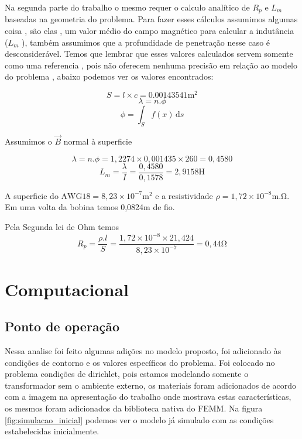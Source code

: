 \documentclass[
	12pt,				%
	openright,			%
	twoside,			%
	a4paper,			%
	english,			%
	french,				%
	spanish,			%
	brazil,				%
	]{abntex2}
\begin{document}
Na segunda parte do trabalho o mesmo requer o calculo analítico de $R_{p}$
e $L_{m}$ baseadas na geometria do problema. Para fazer esses cálculos assumimos algumas coisa , são elas , um valor médio do campo magnético para calcular a indutância ($L_{m}$
), também assumimos que a profundidade de penetração nesse caso é desconsiderável. 
Temos que lembrar que esses valores calculados servem somente como uma referencia , pois não oferecem nenhuma precisão em relação ao modelo do problema , abaixo podemos ver os valores encontrados:

$$S = l \times c = 0.00143541\mathrm{m^{2}}$$
$$\lambda = n . \phi $$
$$\phi = \int_S \! f(x) \, \mathrm{d}s$$

Assumimos o  $\vec B$ normal à superficie 

$$\lambda = n . \phi = 1,2274 \times 0,001435 \times 260 = 0,4580$$
$$L_{m} = \frac{\lambda}{I} = \frac{0,4580}{0,1578} = 2,9158  \mathrm{H}$$

A superficie do $\mathrm{AWG18} = 8,23 \times 10^{-7} \mathrm{m^2}$ e a resistividade $\rho = 1,72 \times 10^{-8} \mathrm{m.\Omega}$. Em uma volta da bobina temos 0,0824m de fio.


Pela Segunda lei de Ohm temos
$$ R_{p} = \frac{\rho . l}{S} = \frac{1,72 \times 10^{-8} \times 21,424}{8,23 \times 10^{-7}} = 0,44 \mathrm{\Omega} $$

\section{Computacional}

\subsection{Ponto de operação}
Nessa analise foi feito algumas adições no modelo proposto, foi adicionado às condições de contorno e os valores específicos do problema. Foi colocado no problema condições de dirichlet, pois estamos modelando somente o transformador sem o ambiente externo, os materiais foram adicionados de acordo com a imagem na apresentação do trabalho onde mostrava estas características, os mesmos foram adicionados da biblioteca nativa do FEMM.
Na figura \ref{fig:simulacao_inicial} podemos ver o modelo já simulado com as condições estabelecidas inicialmente.
\end{document}
